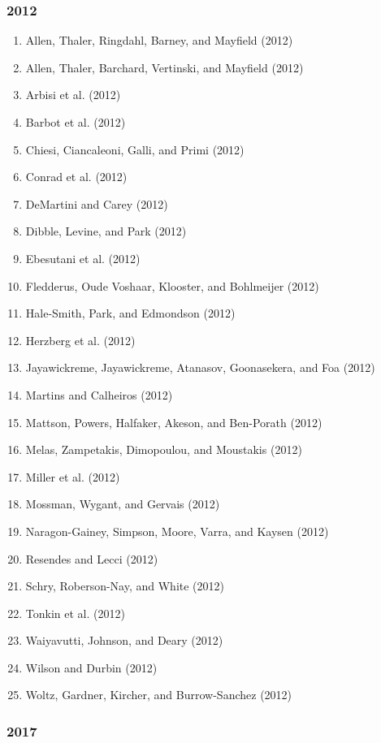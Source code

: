\documentclass[english,man]{apa6}
\providecommand{\tightlist}{%
  \setlength{\itemsep}{0pt}\setlength{\parskip}{0pt}}
\begin{document}
\subsubsection{2012}\label{section-40}

\begin{enumerate}
\def\labelenumi{\arabic{enumi})}
\tightlist
\item
  Allen, Thaler, Ringdahl, Barney, and Mayfield (2012)
\item
  Allen, Thaler, Barchard, Vertinski, and Mayfield (2012)
\item
  Arbisi et al. (2012)
\item
  Barbot et al. (2012)
\item
  Chiesi, Ciancaleoni, Galli, and Primi (2012)
\item
  Conrad et al. (2012)
\item
  DeMartini and Carey (2012)
\item
  Dibble, Levine, and Park (2012)
\item
  Ebesutani et al. (2012)
\item
  Fledderus, Oude Voshaar, Klooster, and Bohlmeijer (2012)
\item
  Hale-Smith, Park, and Edmondson (2012)
\item
  Herzberg et al. (2012)
\item
  Jayawickreme, Jayawickreme, Atanasov, Goonasekera, and Foa (2012)
\item
  Martins and Calheiros (2012)
\item
  Mattson, Powers, Halfaker, Akeson, and Ben-Porath (2012)
\item
  Melas, Zampetakis, Dimopoulou, and Moustakis (2012)
\item
  Miller et al. (2012)
\item
  Mossman, Wygant, and Gervais (2012)
\item
  Naragon-Gainey, Simpson, Moore, Varra, and Kaysen (2012)
\item
  Resendes and Lecci (2012)
\item
  Schry, Roberson-Nay, and White (2012)
\item
  Tonkin et al. (2012)
\item
  Waiyavutti, Johnson, and Deary (2012)
\item
  Wilson and Durbin (2012)
\item
  Woltz, Gardner, Kircher, and Burrow-Sanchez (2012)
\end{enumerate}

\subsubsection{2017}\label{section-41}
\end{document}
